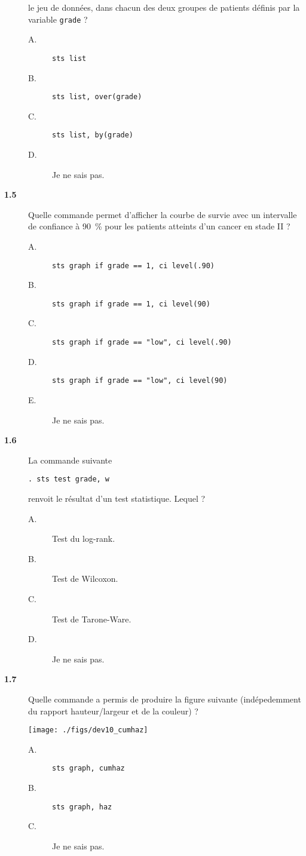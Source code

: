 \begin{description}
  le jeu de données, dans chacun des deux groupes de patients définis par la
  variable \texttt{grade} ?  
\begin{description}
\item[A.] \verb|sts list|
\item[B.] \verb|sts list, over(grade)|
\item[C.] \verb|sts list, by(grade)|
\item[D.] Je ne sais pas.
\end{description}
\item[\bf 1.5] Quelle commande permet d'afficher la courbe de survie avec un
  intervalle de confiance à 90~\% pour les patients atteints d'un cancer en
  stade II ? 
\begin{description}
\item[A.] \verb|sts graph if grade == 1, ci level(.90)|
\item[B.] \verb|sts graph if grade == 1, ci level(90)|
\item[C.] \verb|sts graph if grade == "low", ci level(.90)|
\item[D.] \verb|sts graph if grade == "low", ci level(90)|
\item[E.] Je ne sais pas.
\end{description}
\item[\bf 1.6] La commande suivante 
\begin{verbatim}
. sts test grade, w
\end{verbatim}
renvoit le résultat d'un test statistique. Lequel ?
\begin{description}
\item[A.] Test du log-rank.
\item[B.] Test de Wilcoxon.
\item[C.] Test de Tarone-Ware.
\item[D.] Je ne sais pas.
\end{description}
\item[\bf 1.7] Quelle commande a permis de produire la figure suivante
  (indépedemment du rapport hauteur/largeur et de la couleur) ?
  \begin{center}
    \texttt{[image: ./figs/dev10\_cumhaz]}
  \end{center}
\begin{description}
\item[A.] \verb|sts graph, cumhaz|
\item[B.] \verb|sts graph, haz|
\item[C.] Je ne sais pas.
\end{description}
\end{description}


